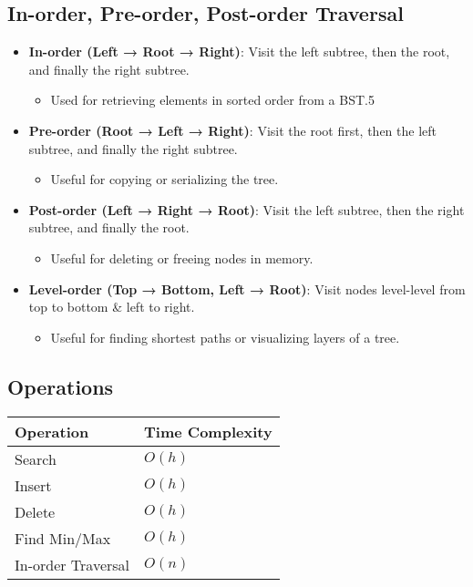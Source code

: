 \subsection{In-order, Pre-order, Post-order Traversal}
\begin{definition}
    \begin{itemize}
        \item \textbf{In-order (Left → Root → Right)}: Visit the left subtree, then the root, and finally the right subtree.
        \begin{itemize}
            \item Used for retrieving elements in sorted order from a BST.5
        \end{itemize}
        \item \textbf{Pre-order (Root → Left → Right)}: Visit the root first, then the left subtree, and finally the right subtree.
        \begin{itemize}
            \item Useful for copying or serializing the tree.
        \end{itemize}
        \item \textbf{Post-order (Left → Right → Root)}: Visit the left subtree, then the right subtree, and finally the root.
        \begin{itemize}
            \item Useful for deleting or freeing nodes in memory.
        \end{itemize}
        \item \textbf{Level-order (Top → Bottom, Left → Root)}: Visit nodes level-level from top to bottom \& left to right.
        \begin{itemize}
            \item Useful for finding shortest paths or visualizing layers of a tree.
        \end{itemize}
    \end{itemize}
\end{definition}

\newpage

\subsection{Operations}
\begin{summary}
    \begin{center}
        \begin{tabular}{ll}
            \toprule
            \textbf{Operation} & \textbf{Time Complexity} \\
            \midrule
            Search & $O(h)$ \\
            \midrule
            Insert & $O(h)$ \\
            \midrule
            Delete & $O(h)$ \\
            \midrule
            Find Min/Max & $O(h)$ \\
            \midrule
            In-order Traversal & $O(n)$ \\
        \end{tabular}
    \end{center}
\end{summary}

